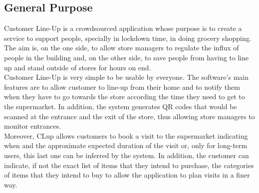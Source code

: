 \subsection{General Purpose}

Customer Line-Up is a crowdsourced application whose purpose is to create a service to support people, specially in lockdown time, in doing grocery shopping. The aim is, on the one side, to allow store managers to regulate the influx of people in the building and, on the other side, to save people from having to line up and stand outside of stores for hours on end.\\
Customer Line-Up is very simple to be usable by everyone. The software’s main features are to allow customer to line-up from their home and to notify them when they have to go towards the store according the time they need to get to the supermarket. In addition, the system generates QR codes that would be scanned at the entrance and the exit of the store, thus allowing store managers to monitor entrances.\\
Moreover, CLup allows customers to book a visit to the supermarket indicating when and the approximate expected duration of the visit or, only for long-term users, this last one can be inferred by the system. In addition, the customer can indicate, if not the exact list of items that they intend to purchase, the categories of items that they intend to buy to allow the application to plan visits in a finer way.\\
